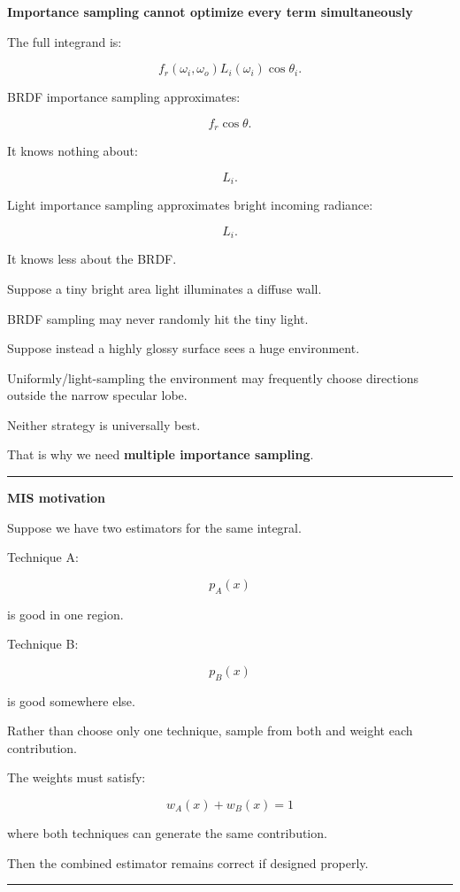 \textbf{Importance sampling cannot optimize every term simultaneously}

The full integrand is:

\[
f_r(\omega_i,\omega_o)
L_i(\omega_i)
\cos\theta_i.
\]

BRDF importance sampling approximates:

\[
f_r\cos\theta.
\]

It knows nothing about:

\[
L_i.
\]

Light importance sampling approximates bright incoming radiance:

\[
L_i.
\]

It knows less about the BRDF.

Suppose a tiny bright area light illuminates a diffuse wall.

BRDF sampling may never randomly hit the tiny light.

Suppose instead a highly glossy surface sees a huge environment.

Uniformly/light-sampling the environment may frequently choose directions outside the narrow specular lobe.

Neither strategy is universally best.

That is why we need \textbf{multiple importance sampling}.

\begin{center}\rule{0.5\linewidth}{0.5pt}\end{center}

\textbf{MIS motivation}

Suppose we have two estimators for the same integral.

Technique A:

\[
p_A(x)
\]

is good in one region.

Technique B:

\[
p_B(x)
\]

is good somewhere else.

Rather than choose only one technique, sample from both and weight each contribution.

The weights must satisfy:

\[
\boxed{
w_A(x)+w_B(x)=1
}
\]

where both techniques can generate the same contribution.

Then the combined estimator remains correct if designed properly.

\begin{center}\rule{0.5\linewidth}{0.5pt}\end{center}

